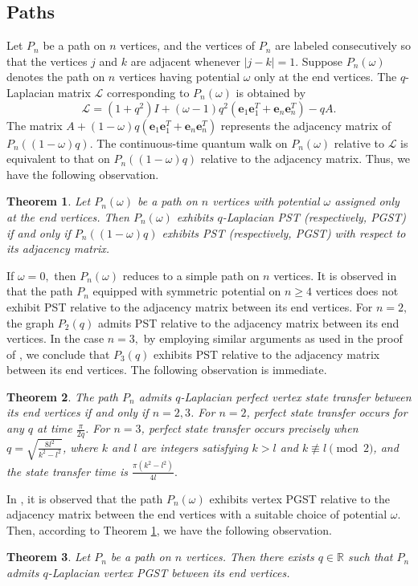 \documentclass[12pt,a4paper]{article}
\newtheorem{thm}{Theorem}
\def \e {{\mathbf e}}
\begin{document}
\subsection{Paths}
Let $P_n$ be a path on $n$ vertices, and the vertices of $P_n$ are labeled consecutively so that the vertices $j$ and $k$ are adjacent whenever $|j-k|=1.$ Suppose $P_n(\omega)$ denotes the path on $n$ vertices having potential $\omega$ only at the end vertices. The $q$-Laplacian matrix $\mathscr{L}$ corresponding to $P_n(\omega)$ is obtained by
$$\mathscr{L}=(1+q^2)I+(\omega -1)q^2(\e_1\e_1^T+\e_n\e_n^T)-qA.$$
The matrix $A+(1-\omega)q(\e_1\e_1^T+\e_n\e_n^T)$ represents the adjacency matrix of $P_n((1-\omega)q)$. The continuous-time quantum walk on $P_n(\omega)$ relative to $\mathscr{L}$ is equivalent to that on $P_n((1-\omega)q)$ relative to the adjacency matrix. Thus, we have the following observation.

\begin{thm}\label{T8}
Let $P_n(\omega)$ be a path on $n$ vertices with potential $\omega$ assigned only at the end vertices. Then $P_n(\omega)$ exhibits $q$-Laplacian PST (respectively, PGST) if and only if $P_n((1-\omega)q)$ exhibits PST (respectively, PGST) with respect to its adjacency matrix.
\end{thm}
If $\omega=0,$ then $P_n(\omega)$ reduces to a simple path on $n$ vertices. It is observed in \cite[Theorem 3.4 and Theorem 3.8]{kempton} that the path $P_n$ equipped with symmetric potential on $n \geq 4$ vertices does not exhibit PST relative to the adjacency matrix between its end vertices. For $n=2,$ the graph $P_2(q)$ admits PST relative to the adjacency matrix between its end vertices. In the case $n=3,$ by employing similar arguments as used in the proof of \cite[Theorem 3.3]{kempton2}, we conclude that $P_3(q)$ exhibits PST relative to the adjacency matrix between its end vertices. The following observation is immediate.

\begin{thm}\label{T9}
The path $P_n$ admits $q$-Laplacian perfect vertex state transfer between its end vertices if and only if $n =2,3$. For $n = 2$, perfect state transfer occurs for any $q$ at time $\frac{\pi}{2q}$. For $n = 3$, perfect state transfer occurs precisely when $q = \sqrt{\frac{8l^2}{k^2 - l^2}}$, where $k$ and $l$ are integers satisfying $k > l$ and $k \not\equiv l \pmod{2}$, and the state transfer time is $ \frac{\pi(k^2 - l^2)}{4l}.$
\end{thm}
In \cite[Theorem 3]{kempton}, it is observed that the path $P_n(\omega)$ exhibits vertex PGST relative to the adjacency matrix between the end vertices with a suitable choice of potential $\omega$. Then, according to Theorem \ref{T8}, we have the following observation.
\begin{thm}
Let $P_n$ be a path on $n$ vertices. Then there exists $q \in \mathbb{R}$ such that $P_n$ admits $q$-Laplacian vertex PGST between its end vertices.
\end{thm}
\end{document}
